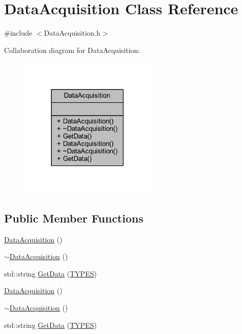 \hypertarget{class_data_acquisition}{}\section{Data\+Acquisition Class Reference}
\label{class_data_acquisition}


{\ttfamily \#include $<$Data\+Acquisition.\+h$>$}



Collaboration diagram for Data\+Acquisition\+:\nopagebreak
\begin{figure}[H]
\begin{center}
\leavevmode
\includegraphics[width=186pt]{class_data_acquisition__coll__graph}
\end{center}
\end{figure}
\subsection*{Public Member Functions}
\begin{DoxyCompactItemize}
\item 
\mbox{\hyperlink{class_data_acquisition_a219a57019cb7f899040d2d852790b0cf}{Data\+Acquisition}} ()
\item 
\mbox{\hyperlink{class_data_acquisition_ab3abaaa3e35419b5de6efdeb76747bec}{$\sim$\+Data\+Acquisition}} ()
\item 
std\+::string \mbox{\hyperlink{class_data_acquisition_ad737fcbfe342830dae2a3b46b63d3dbd}{Get\+Data}} (\mbox{\hyperlink{_class_adapter_2_class_adapter_2_data_8h_aacb79576e5cf053ee9c93cb9d665e32b}{T\+Y\+P\+ES}})
\item 
\mbox{\hyperlink{class_data_acquisition_a219a57019cb7f899040d2d852790b0cf}{Data\+Acquisition}} ()
\item 
\mbox{\hyperlink{class_data_acquisition_ab3abaaa3e35419b5de6efdeb76747bec}{$\sim$\+Data\+Acquisition}} ()
\item 
std\+::string \mbox{\hyperlink{class_data_acquisition_ad737fcbfe342830dae2a3b46b63d3dbd}{Get\+Data}} (\mbox{\hyperlink{_class_adapter_2_class_adapter_2_data_8h_aacb79576e5cf053ee9c93cb9d665e32b}{T\+Y\+P\+ES}})
\end{DoxyCompactItemize}


